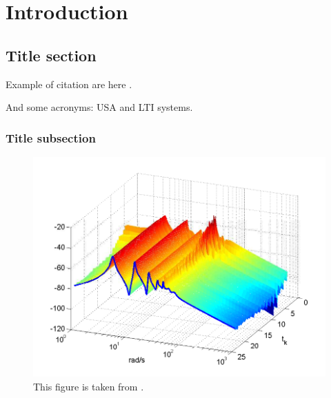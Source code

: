 \doublespacing %

\chapter{Introduction}
\label{ch1}

\begin{spacing}{1} %
\minitoc %
\end{spacing} %
\thesisspacing %


\section{Title section}

\kant[1]

Example of citation are here
\cite{AdaAroKre:71,PadScaAst:16a,PadScaAst:16b,PavVdWNij:06,PurBorVar:96,SLICOT,Sca:16,Sca:16a,Sca:16b,Sca:17,Sca:18}.

And some acronyms: \ac{USA} and \ac{LTI} systems.

\subsection{Title subsection}

\kant[1-10]


\begin{figure}
\centering
\includegraphics[width=0.8\columnwidth]{assets/buildmagnitude.pdf}
\caption[Short description for list of figures]{This figure is taken from \cite{Sca:16}.}
\label{fig-magnitude}
\end{figure}%


